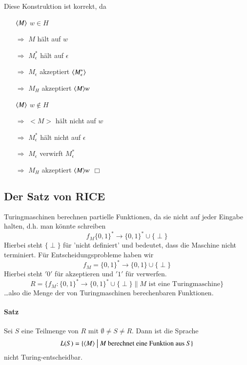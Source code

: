 \par\medskip Diese Konstruktion ist korrekt, da \par\medskip
\begin{itemize}
	\item[$\langle M \rangle$] $w \in H$
	\item[$\Rightarrow$] $M$ hält auf $w$
	\item[$\Rightarrow$] $M_\epsilon^*$ hält auf $\epsilon$
	\item[$\Rightarrow$] $M_\epsilon$ akzeptiert $\langle M_\epsilon^* \rangle$
	\item[$\Rightarrow$] $M_H$ akzeptiert $\langle M \rangle w$
	
	\item[$\langle M \rangle$] $w \not\in H$
	\item[$\Rightarrow$] $<M>$ hält nicht auf $w$
	\item[$\Rightarrow$] $M_\epsilon^*$ hält nicht auf $\epsilon$
	\item[$\Rightarrow$] $M_\epsilon$ verwirft $M_\epsilon^*$
	\item[$\Rightarrow$] $M_H$ akzeptiert $\langle M \rangle w$ \hspace{1cm} $\Box$
\end{itemize}


\subsection{Der Satz von RICE}

Turingmaschinen berechnen partielle Funktionen, da sie nicht auf jeder Eingabe halten, d.h. man könnte schreiben $$ f_M\{0,1\}^* \rightarrow \{0,1\}^*\cup\{\perp\} $$ Hierbei steht $\{\perp\}$ für 'nicht definiert' und bedeutet, dass die Maschine nicht terminiert. Für Entscheidungsprobleme haben wir $$ f_M=\{0,1\}^* \rightarrow \{0,1\}\cup\{\perp\}$$ Hierbei steht $'0'$ für akzeptieren und $'1'$ für verwerfen. $$ R=\{  f_M:\{0,1\}^* \rightarrow \{0,1\}^*\cup\{\perp\} \| M \text{ ist eine Turingmaschine}\} $$ \dots also die Menge der von Turingmaschinen berechenbaren Funktionen.

\paragraph*{Satz} Sei $S$ eine Teilmenge von $R$ mit $\emptyset\not=S\not=R$. Dann ist die Sprache $$L(S)=\{\langle M \rangle\ \big|\ M \text{ berechnet eine Funktion aus } S\}$$ nicht Turing-entscheidbar.

